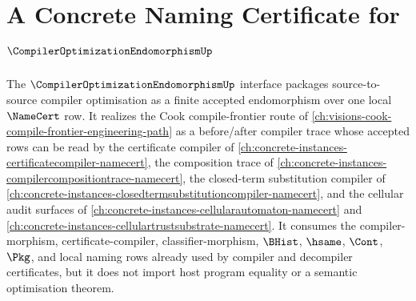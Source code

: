 \chapter{A Concrete Naming Certificate for $\CompilerOptimizationEndomorphismUp$}
\label{ch:concrete-instances-compiler-optimization-endomorphism-namecert}

The $\CompilerOptimizationEndomorphismUp$ interface packages source-to-source compiler optimisation as a finite accepted endomorphism over one local $\NameCert$ row. It realizes the Cook compile-frontier route of \autoref{ch:visions-cook-compile-frontier-engineering-path} as a before/after compiler trace whose accepted rows can be read by the certificate compiler of \autoref{ch:concrete-instances-certificatecompiler-namecert}, the composition trace of \autoref{ch:concrete-instances-compilercompositiontrace-namecert}, the closed-term substitution compiler of \autoref{ch:concrete-instances-closedtermsubstitutioncompiler-namecert}, and the cellular audit surfaces of \autoref{ch:concrete-instances-cellularautomaton-namecert} and \autoref{ch:concrete-instances-cellulartrustsubstrate-namecert}. It consumes the compiler-morphism, certificate-compiler, classifier-morphism, $\BHist$, $\hsame$, $\Cont$, $\Pkg$, and local naming rows already used by compiler and decompiler certificates, but it does not import host program equality or a semantic optimisation theorem.



